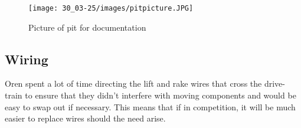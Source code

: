 \documentclass{article}
\begin{document}
\begin{figure}
    \centering
    \texttt{[image: 30\_03-25/images/pitpicture.JPG]}
    \caption{Picture of pit for documentation}
    \label{fig:diagram}
\end{figure}

\subsection{Wiring}
Oren spent a lot of time directing the lift and rake wires that cross the drive-train to ensure that they didn't interfere with moving components and would be easy to swap out if necessary. This means that if in competition, it will be much easier to replace wires should the need arise. 
\end{document}
